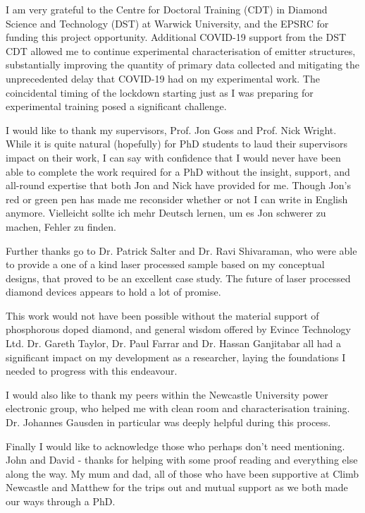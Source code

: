 
\begin{acknowledgements}      

I am very grateful to the Centre for Doctoral Training (CDT) in Diamond Science and Technology (DST) at Warwick University, and the EPSRC for funding this project opportunity. Additional COVID-19 support from the DST CDT allowed me to continue experimental characterisation of emitter structures, substantially improving the quantity of primary data collected and mitigating the unprecedented delay that COVID-19 had on my experimental work. The coincidental timing of the lockdown starting just as I was preparing for experimental training posed a significant challenge.

I would like to thank my supervisors, Prof. Jon Goss and Prof. Nick Wright. While it is quite natural (hopefully) for PhD students to laud their supervisors impact on their work, I can say with confidence that I would never have been able to complete the work required for a PhD without the insight, support, and all-round expertise that both Jon and Nick have provided for me. Though Jon's red or green pen has made me reconsider whether or not I can write in English anymore. Vielleicht sollte ich mehr Deutsch lernen, um es Jon schwerer zu machen, Fehler zu finden.

Further thanks go to Dr. Patrick Salter and Dr. Ravi Shivaraman, who were able to provide a one of a kind laser processed sample based on my conceptual designs, that proved to be an excellent case study. The future of laser processed diamond devices appears to hold a lot of promise. 

This work would not have been possible without the material support of phosphorous doped diamond, and general wisdom offered by Evince Technology Ltd. Dr. Gareth Taylor, Dr. Paul Farrar and Dr. Hassan Ganjitabar all had a significant impact on my development as a researcher, laying the foundations I needed to progress with this endeavour.

I would also like to thank my peers within the Newcastle University power electronic group, who helped me with clean room and characterisation training. Dr. Johannes Gausden in particular was deeply helpful during this process.

Finally I would like to acknowledge those who perhaps don't need mentioning. John and David - thanks for helping with some proof reading and everything else along the way. My mum and dad, all of those who have been supportive at Climb Newcastle and Matthew for the trips out and mutual support as we both made our ways through a PhD.
\end{acknowledgements}
